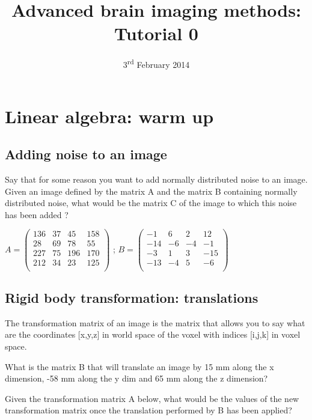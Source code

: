 \documentclass[a4paper,10pt]{article}
\title{Advanced brain imaging methods: Tutorial 0}
\author{}
\date{3\textsuperscript{rd} February 2014}
\begin{document}
\maketitle

\section{Linear algebra: warm up}

\subsection{Adding noise to an image}

Say that for some reason you want to add normally distributed noise to an 
image. Given an image defined by the matrix A and the matrix B containing 
normally distributed noise, what would be the matrix C of the image to which 
this noise has been added ? 

\bigskip
$ A =
\left(\begin{array}{cccc}
136	& 37	& 45	& 158\\ 
28	& 69	& 78	& 55 \\
227	& 75	& 196	& 170\\
212	& 34	& 23	& 125\\
\end{array}\right) 
$
;
$B =
\left(\begin{array}{cccc}
-1	& 6	& 2	& 12\\
-14	& -6	& -4	& -1\\
-3	& 1	& 3	& -15\\
-13	& -4	& 5	& -6\\
\end{array}\right) 
$
\bigskip

\subsection{Rigid body transformation: translations}

The transformation matrix of an image is the matrix that allows you to say what 
are the coordinates [x,y,z] in world space of the voxel with indices [i,j,k] in 
voxel space.

What is the matrix B that will translate an image by 15 mm along the x 
dimension, -58 mm along the y dim and 65 mm along the z dimension?

Given the transformation matrix A below, what would be the values of the new 
transformation matrix once the translation performed by B has been applied?
\end{document}
